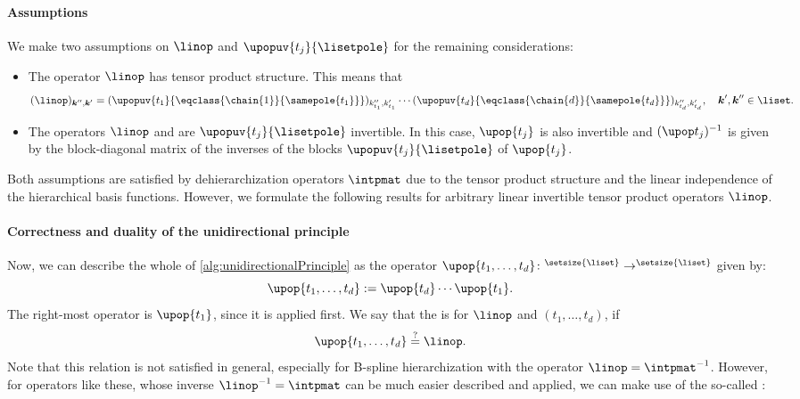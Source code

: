 \paragraph{Assumptions}

We make two assumptions on $\linop$ and $\upopuv{t_j}{\lisetpole}$
for the remaining considerations:
\begin{itemize}
  \item
  The operator $\linop$ has tensor product structure.
  This means that
  \begin{equation}
    \label{eq:tensorProductOperator}
    (\linop)_{\*k'',\*k'}
    =
    (\upopuv{t_1}{\eqclass{\chain{1}}{\samepole{t_1}}})_{k''_{t_1},k'_{t_1}}
    \dotsm
    (\upopuv{t_d}{\eqclass{\chain{d}}{\samepole{t_d}}})_{k''_{t_d},k'_{t_d}},
    \quad
    \*k', \*k'' \in \liset.
  \end{equation}
  
  \item
  The operators $\linop$ and are $\upopuv{t_j}{\lisetpole}$ invertible.
  In this case, $\upop{t_j}$ is also invertible and
  $\upopinv{t_j}$ is given by the block-diagonal matrix of
  the inverses of the blocks $\upopuv{t_j}{\lisetpole}$ of $\upop{t_j}$.
\end{itemize}
Both assumptions are satisfied by dehierarchization
operators $\intpmat$ due to the tensor product structure and the
linear independence of the hierarchical basis functions.
However, we formulate the following results for arbitrary
linear invertible tensor product operators $\linop$.

\paragraph{Correctness and duality of the unidirectional principle}

Now, we can describe the whole \up of
\cref{alg:unidirectionalPrinciple} as the operator
$\upop{t_1,\dotsc,t_d}\colon \real^{\setsize{\liset}} \to
\real^{\setsize{\liset}}$ given by:
\begin{equation}
  \label{eq:upopProduct}
  \upop{t_1,\dotsc,t_d}
  := \upop{t_d} \dotsm \upop{t_1}.
\end{equation}
The right-most operator is $\upop{t_1}$, since it is applied first.
We say that the \up is  for $\linop$ and
$(t_1, \dotsc, t_d)$, if
\begin{equation}
  \upop{t_1,\dotsc,t_d}
  \overset{?}{=} \linop.
\end{equation}
Note that this relation is not satisfied in general,
especially for B-spline hierarchization with the operator
$\linop = \intpmatinv$.
However, for operators like these, whose inverse
$\linopinv = \intpmat$ can be much easier described and applied,
we can make use of the so-called :

